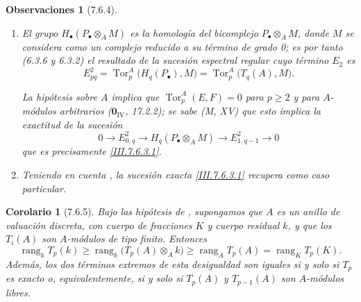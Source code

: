 \documentclass[10pt,oneside,openany]{book}
\theoremstyle{egaenv}\newtheorem*{env}{---}
\theoremstyle{egastatement}
\newtheorem*{corollary}{Corolario}
\theoremstyle{egadescription}
\newtheorem*{remarks}{Observaciones}
\newcommand{\oldpage}[2][]{\marginnote{\normalfont\scriptsize\textbf{#1}\,|\,#2}\ignorespaces}
\renewcommand{\geq}{\geqslant}
\begin{document}
\begin{remarks}[7.6.4]
\label{III.7.6.4}
\begin{enumerate}
\item[(i)]
El grupo $H_\bullet(P_\bullet\otimes_A M)$ es la homología del
bicomplejo $P_\bullet\otimes_A M$, donde $M$ se considera como un complejo reducido a su
    término de grado 0; es por tanto (6.3.6 y 6.3.2) el resultado de la
    sucesión espectral regular cuyo término $E_2$ es
\[
      E^2_{pq}
      =
      \operatorname{Tor}_p^A\bigl(H_q(P_\bullet),M\bigr)
      =
      \operatorname{Tor}_p^A\bigl(T_q(A),M\bigr).
    \]

\oldpage[III]{194}
La hipótesis sobre $A$ implica que $\operatorname{Tor}_p^A(E,F)=0$ para $p\geq2$
y para $A$-módulos
    arbitrarios ($\mathbf{0}_{\mathrm{IV}}$, 17.2.2); se sabe (M, XV) que esto implica
    la exactitud de la sucesión
    \[
      0\longrightarrow E^2_{0,q}
      \longrightarrow H_q(P_\bullet\otimes_A M)
      \longrightarrow E^2_{1,q-1}
      \longrightarrow0
    \]
que es precisamente \eqref{III.7.6.3.1}.

\medskip
\item[(ii)]
Teniendo en cuenta , la sucesión exacta
\eqref{III.7.6.3.1} recupera  como caso particular.
\end{enumerate}
\end{remarks}

\begin{corollary}[7.6.5]
\label{III.7.6.5}
Bajo las hipótesis de , supongamos que $A$ es un
anillo de valuación discreta, con cuerpo de fracciones $K$ y cuerpo
residual $k$, y que los $T_i(A)$ son $A$-módulos de tipo finito.
Entonces
\[
  \operatorname{rang}_k T_p(k)
  \geq
  \operatorname{rang}_k\bigl(T_p(A)\otimes_A k\bigr)
  \geq
  \operatorname{rang}_A T_p(A)
  =
  \operatorname{rang}_K T_p(K).
  \tag{7.6.5.1}\label{III.7.6.5.1.fr}
\]
Además, los dos términos extremos de esta desigualdad son iguales si
y solo si $T_p$ es exacto o, equivalentemente, si y solo si $T_p(A)$
y $T_{p-1}(A)$ son $A$-módulos libres.
\end{corollary}
\end{document}
